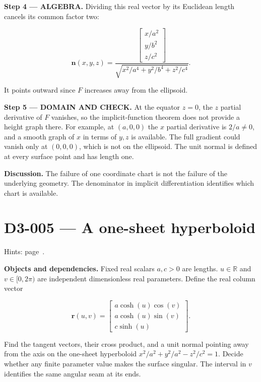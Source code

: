 \documentclass[11pt,oneside,openany]{book}
\begin{document}
\begingroup\color{AlgebraBlue}
\textbf{Step 4 --- ALGEBRA.} Dividing this real vector by its Euclidean length cancels its common factor two:

\[
\mathbf n(x,y,z)=\frac{\begin{bmatrix}x/a^2\\y/b^2\\z/c^2\end{bmatrix}}
{\sqrt{x^2/a^4+y^2/b^4+z^2/c^4}}.
\]

It points outward since \(F\) increases away from the ellipsoid.

\endgroup
\begin{DomainStep}
\textbf{Step 5 --- DOMAIN AND CHECK.} At the equator \(z=0\), the \(z\) partial derivative of \(F\) vanishes, so the implicit-function theorem does not provide a height graph there. For example, at \((a,0,0)\) the \(x\) partial derivative is \(2/a\ne0\), and a smooth graph of \(x\) in terms of \(y,z\) is available. The full gradient could vanish only at \((0,0,0)\), which is not on the ellipsoid. The unit normal is defined at every surface point and has length one.

\end{DomainStep}
\textbf{Discussion.} The failure of one coordinate chart is not the failure of the underlying geometry. The denominator in implicit differentiation identifies which chart is available.
\clearpage
\section{D3-005 --- A one-sheet hyperboloid}
\label{problem:D3-005}
{\small Hints: page~\pageref{hints:D3-005}.}\par\medskip

\textbf{Objects and dependencies.} Fixed real scalars \(a,c>0\) are lengths. \(u\in\mathbb R\) and \(v\in[0,2\pi)\) are independent dimensionless real parameters. Define the real column vector

\[
\mathbf r(u,v)=\begin{bmatrix}a\cosh(u)\cos(v)\\a\cosh(u)\sin(v)\\c\sinh(u)\end{bmatrix}.
\]

Find the tangent vectors, their cross product, and a unit normal pointing away from the axis on the one-sheet hyperboloid \(x^2/a^2+y^2/a^2-z^2/c^2=1\). Decide whether any finite parameter value makes the surface singular. The interval in \(v\) identifies the same angular seam at its ends.
\end{document}
